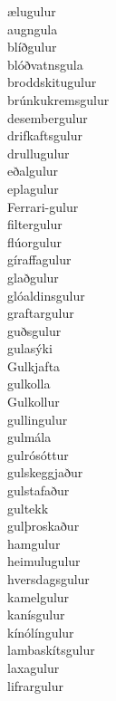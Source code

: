 \documentclass[../samsetningasafn.tex]{subfiles}
\begin{document}
\begin{bigwordlist}
\begin{footnotesize}
\begin{multicols}{4}
	\begin{description}
		\item [ælugulur]
		\item [augngula]
		\item [blíðgulur]
		\item [blóðvatnsgula]
		\item [broddskitugulur]
		\item [brúnkukremsgulur]
		\item [desembergulur]
		\item [drifkaftsgulur]
		\item [drullugulur]
		\item [eðalgulur]
		\item [eplagulur]
		\item [Ferrari-gulur]
		\item [filtergulur]
		\item [flúorgulur]
		\item [gíraffagulur]
		\item [glaðgulur]
		\item [glóaldinsgulur]
		\item [graftargulur]
		\item [guðsgulur]
		\item [gulasýki]
		\item [Gulkjafta]
		\item [gulkolla]
		\item [Gulkollur]
		\item [gullingulur]
		\item [gulmála]
		\item [gulrósóttur]
		\item [gulskeggjaður]
		\item [gulstafaður]
		\item [gultekk]
		\item [gulþroskaður]
		\item [hamgulur]
		\item [heimulugulur]
		\item [hversdagsgulur]
		\item [kamelgulur]
		\item [kanísgulur]
		\item [kínólíngulur]
		\item [lambaskítsgulur]
		\item [laxagulur]
		\item [lifrargulur]

\end{description}
\end{multicols}
\end{footnotesize}
\end{bigwordlist}
\end{document}
